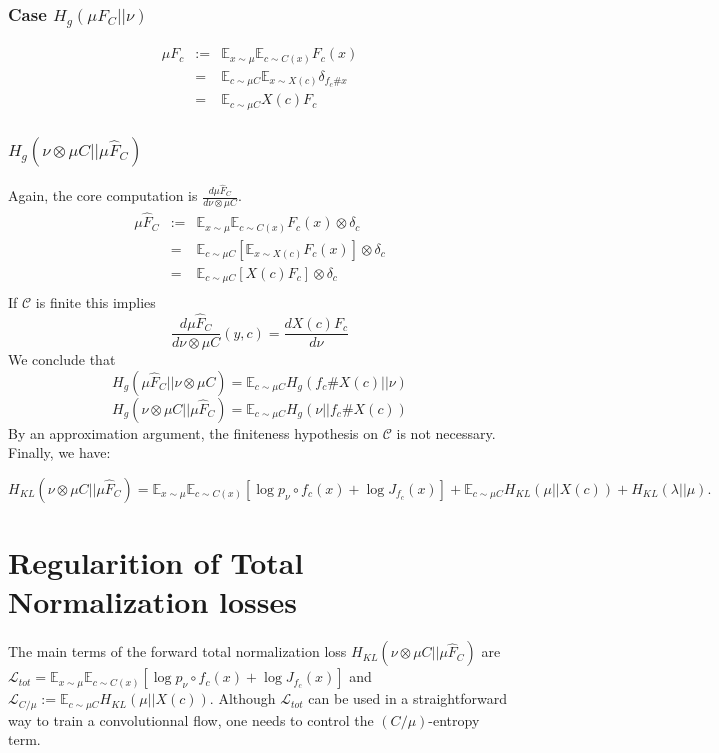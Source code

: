 \documentclass[a4paper,10pt]{article}
\def\EE{\mathbb{E}}
\begin{document}
\subsubsection{Case $H_g(\mu F_C || \nu)$}
    \begin{eqnarray}
        \mu F_c &:=& \EE_{x\sim \mu} \EE_{c\sim C(x)} F_c(x) \\
        &=& \EE_{c\sim \mu C} \EE_{x\sim X(c)} \delta_{f_c\# x} \\
        &=& \EE_{c\sim \mu C} X(c)F_c
    \end{eqnarray}




\subsubsection{$H_g( \nu \otimes \mu C || \mu \widehat F_C)$}

    Again, the core computation is $\frac{d \mu \widehat F_C}{d\nu\otimes \mu C}$.
    \begin{eqnarray}
        \mu \widehat F_C &:=& \EE_{x\sim \mu} \EE_{c\sim C(x)} F_c(x)\otimes\delta_c \\
        &=& \EE_{c\sim \mu C} \left[\EE_{x\sim X(c)} F_c(x)\right] \otimes \delta_c \\
        &=& \EE_{c\sim \mu C} \left[X(c)F_c\right] \otimes \delta_c \\
    \end{eqnarray}
    If $\mathcal C$ is finite this implies
    $$ \frac{d \mu \widehat F_C}{d \nu\otimes \mu C}(y,c) = \frac{d X(c)F_c}{d \nu}$$
    We conclude that
    $$ H_{g}(\mu \widehat F_C || \nu\otimes \mu C) = \EE_{c\sim \mu C} H_{g}(f_c\# X(c) || \nu) $$
    $$ H_{g}( \nu\otimes \mu C || \mu \widehat F_C ) = \EE_{c\sim \mu C} H_{g}(\nu||f_c\# X(c) )  $$
By an approximation argument, the finiteness hypothesis on $\mathcal C$ is not necessary. Finally, we have:

$$ H_{KL}( \nu\otimes \mu C || \mu \widehat F_C )  = \EE_{x\sim \mu} \EE_{c\sim C(x)} \left[ \log p_\nu \circ f_c(x) +\log J_{f_c}(x) \right] + \EE_{c\sim \mu C} H_{KL}(\mu||X(c)) + H_{KL}(\lambda||\mu)  .$$

\section{Regularition of Total Normalization losses}
The main terms of the forward total normalization loss $H_{KL}( \nu\otimes \mu C || \mu \widehat F_C )$ are
$\mathcal L_{tot}=\EE_{x\sim \mu} \EE_{c\sim C(x)} \left[ \log p_\nu \circ f_c(x) +\log J_{f_c}(x) \right]$ and  $\mathcal L _{C/\mu}:=\EE_{c\sim \mu C} H_{KL}(\mu||X(c)) $.
Although $\mathcal L_{tot}$ can be used in a straightforward way to train a convolutionnal flow, one needs to control the $(C/\mu)$-entropy term.
\end{document}
